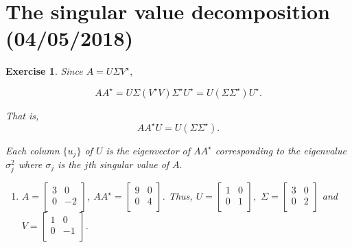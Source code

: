 \documentclass[paper=a4, fontsize=11pt]{scrartcl} %
\numberwithin{equation}{section} %
\numberwithin{figure}{section} %
\numberwithin{table}{section} %
\newtheorem{exercise}{Exercise}
\numberwithin{exercise}{section}
\begin{document}
\section{The singular value decomposition (04/05/2018)}
\begin{exercise}

Since $A=U\Sigma V^{\star},$

$$AA^{\star}=U\Sigma( V^{\star} V )\Sigma^{\star} U^{\star}=U(\Sigma\Sigma^{\star}) U^{\star}.$$

That is,
$$ AA^{\star} U=U(\Sigma\Sigma^{\star}).$$

Each column $\{u_j\}$ of $U$ is the eigenvector of $AA^{\star}$ corresponding to the eigenvalue $\sigma_j^2$ where $\sigma_j$ is the $j$th singular value of $A.$

\begin{enumerate}
\item $A=\begin{bmatrix}
3 & 0 \\
0 & -2 \\
\end{bmatrix}$,  $AA^{\star}=\begin{bmatrix}
9 & 0\\
0 & 4\\
\end{bmatrix}$.
Thus, $U=\begin{bmatrix}
1& 0 \\
0 & 1 \\
\end{bmatrix},$ $\Sigma=\begin{bmatrix}
3 & 0 \\
0 & 2 \\
\end{bmatrix}$ and $V=\begin{bmatrix}
1 & 0 \\
0 & -1 \\
\end{bmatrix}$.


\end{enumerate}
\end{exercise}
\end{document}
